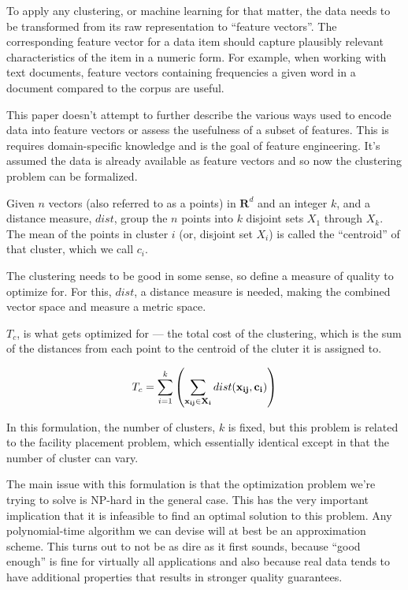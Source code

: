 \documentclass{article}
\begin{document}
To apply any clustering, or machine learning for that matter, the data needs to
be transformed from its raw representation to ``feature vectors''. The
corresponding feature vector for a data item should capture plausibly relevant
characteristics of the item in a numeric form.
For example, when working with text documents, feature vectors containing
frequencies a given word in a document compared to the corpus are useful.

This paper doesn't attempt to further describe the various ways used to encode
data into feature vectors or assess the usefulness of a subset of features.
This is requires domain-specific knowledge and is the goal of feature engineering.
It's assumed the data is already available as feature vectors and so now
the clustering problem can be formalized.

Given $n$ vectors (also referred to as a points) in $\textbf{R}^d$ and an
integer $k$, and a distance measure, $dist$, group the $n$ points
into $k$ disjoint sets $X_1$ through $X_k$. The mean of
the points in cluster $i$ (or, disjoint set $X_i$) is called the ``centroid''
of that cluster, which we call $c_i$.

The clustering needs to be good in some sense, so define a measure of
quality to optimize for. For this, $dist$, a distance measure is needed, making the combined vector space and measure a metric space.

$T_c$, is what gets optimized for --- the total cost of the clustering, which is the sum of the distances
from each point to the centroid of the cluter it is assigned to.

\begin{eqnarray}
    T_c = \sum_{i = 1}^{k} \left( \sum_{\bf x_{ij} \in X_i} dist({\bf x_{ij}},
    {\bf c_i})
    \right)
\end{eqnarray}

In this formulation, the number of clusters, $k$ is fixed, but this problem is
related to the facility placement problem, which essentially identical except
in that the number of cluster can vary.

The main issue with this formulation is that the optimization problem we're
trying to solve is NP-hard in the general case.
This has the very important implication that it is infeasible to find an
optimal solution to this problem. Any polynomial-time algorithm we can devise
will at best be an approximation scheme.
This turns out to not be as dire as it first sounds, because ``good enough'' is
fine for virtually all applications and also because real data tends to have
additional properties that results in stronger quality guarantees.
\end{document}
